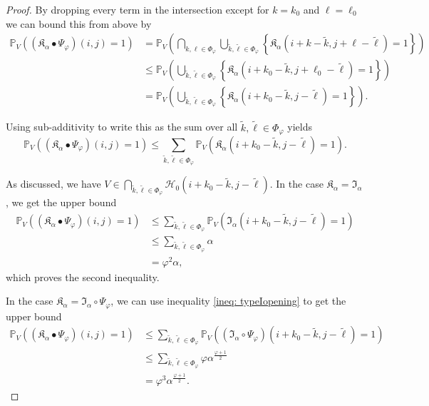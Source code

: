 \documentclass[a4paper,12pt]{article}
\theoremstyle{plain}
\theoremstyle{definition}
\numberwithin{equation}{section}
\begin{document}
\begin{proof}
	By dropping every term in the intersection except for $k = k_0$ and $\ell = \ell_0$ we can bound this from above by
	\begin{align*}
		\mathbb{P}_V\left( (\mathfrak{K}_\alpha \bullet \Psi_\varphi)(i, j) = 1 \right) &= \mathbb{P}_V\left( \bigcap_{k, \ell \in \Phi_\varphi} \bigcup_{\tilde{k}, \tilde{\ell} \in \Phi_\varphi} \left\{ \mathfrak{K}_\alpha(i + k - \tilde{k}, j + \ell - \tilde{\ell}) = 1 \right\} \right) \\
		&\leq \mathbb{P}_V\left( \bigcup_{\tilde{k}, \tilde{\ell} \in \Phi_\varphi} \left\{ \mathfrak{K}_\alpha(i + k_0 - \tilde{k}, j + \ell_0 - \tilde{\ell}) = 1 \right\} \right) \\
		&= \mathbb{P}_V\left( \bigcup_{\tilde{k}, \tilde{\ell} \in \Phi_\varphi} \left\{ \mathfrak{K}_\alpha(i + k_0 - \tilde{k}, j - \tilde{\ell}) = 1 \right\} \right).
	\end{align*}
	
	Using sub-additivity to write this as the sum over all $\tilde{k}, \tilde{\ell} \in \Phi_\varphi$ yields
	\begin{equation*}
		\mathbb{P}_V\left( (\mathfrak{K}_\alpha \bullet \Psi_\varphi)(i, j) = 1 \right) \leq \sum_{\tilde{k}, \tilde{\ell} \in \Phi_\varphi} \mathbb{P}_V\left( \mathfrak{K}_\alpha(i + k_0 - \tilde{k}, j - \tilde{\ell}) = 1 \right).
	\end{equation*}
	
	As discussed, we have $V \in \bigcap_{\tilde{k}, \tilde{\ell} \in \Phi_\varphi} \mathcal{H}_0(i + k_0 - \tilde{k}, j - \tilde{\ell})$. In the case $\mathfrak{K}_\alpha = \mathfrak{I}_\alpha$, we get the upper bound
	\begin{align*}
		\mathbb{P}_V\left( (\mathfrak{K}_\alpha \bullet \Psi_\varphi)(i, j) = 1 \right) &\leq \sum_{\tilde{k}, \tilde{\ell} \in \Phi_\varphi} \mathbb{P}_V\left( \mathfrak{I}_\alpha(i + k_0 - \tilde{k}, j - \tilde{\ell}) = 1 \right) \\
		&\leq \sum_{\tilde{k}, \tilde{\ell} \in \Phi_\varphi} \alpha \\
		&= \varphi^2 \alpha,
	\end{align*}
	which proves the second inequality.
	
	In the case $\mathfrak{K}_\alpha = \mathfrak{I}_\alpha \circ \Psi_\varphi$, we can use inequality \eqref{ineq: typeIopening} to get the upper bound
	\begin{align*}
		\mathbb{P}_V\left( (\mathfrak{K}_\alpha \bullet \Psi_\varphi)(i, j) = 1 \right) &\leq \sum_{\tilde{k}, \tilde{\ell} \in \Phi_\varphi} \mathbb{P}_V\left( (\mathfrak{I}_\alpha \circ \Psi_\varphi)(i + k_0 - \tilde{k}, j - \tilde{\ell}) = 1 \right) \\
		&\leq \sum_{\tilde{k}, \tilde{\ell} \in \Phi_\varphi} \varphi \alpha^{\frac{\varphi + 1}{2}} \\
		&= \varphi^3 \alpha^{\frac{\varphi + 1}{2}}.
	\end{align*}
	

\end{proof}
\end{document}
